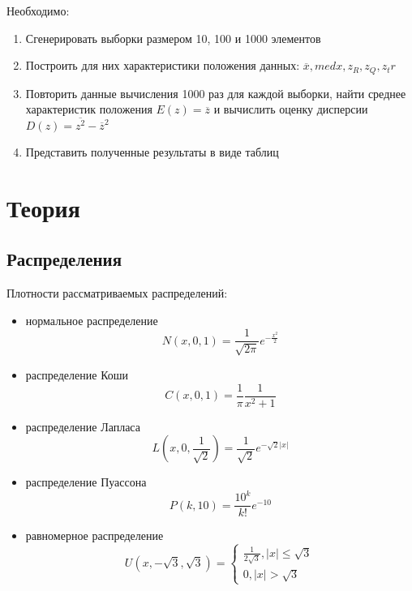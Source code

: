 \documentclass[12pt,a4paper]{article}
\begin{document}
Необходимо:
\begin{enumerate}
    \item Сгенерировать выборки размером 10, 100 и 1000 элементов
    \item Построить для них характеристики положения данных: $\overline{x}, med x, z_R, z_Q, z_tr$
    \item Повторить данные вычисления 1000 раз для каждой выборки, найти среднее характеристик положения $E(z)=\overline{z}$ и вычислить оценку дисперсии $D(z)=\overline{z^2}-{\overline{z}}^2$
    \item Представить полученные результаты в виде таблиц
\end{enumerate}

\section{Теория}
\subsection{Распределения}
Плотности рассматриваемых распределений:
\begin{itemize}
		\item нормальное распределение
		    \begin{equation}
			    N(x,0,1)=\frac{1}{\sqrt{2\pi}}e^{-\frac{x^2}{2}}
			    \label{normal} 
			\end{equation}
		\item распределение Коши
		    \begin{equation}
				C(x,0,1)=\frac{1}{\pi}\frac{1}{x^2+1}
				\label{cauchy}
			\end{equation} 
		\item распределение Лапласа
		    \begin{equation}
				L(x,0,\frac{1}{\sqrt{2}})=\frac{1}{\sqrt{2}}e^{-\sqrt{2}|x|}
				\label{laplace} 
			\end{equation}
		\item распределение Пуассона
		    \begin{equation}
				P(k,10)=\frac{10^k}{k!}e^{-10}
				\label{poisson}
			\end{equation}
		\item равномерное распределение
		    \begin{equation}
				U(x,-\sqrt{3},\sqrt{3})=
				\begin{cases}
					\frac{1}{2\sqrt{3}},|x|\leq\sqrt{3}\\0,|x|>\sqrt{3}
				\end{cases}
				\label{uniform}
			\end{equation}
\end{itemize}
\end{document}
